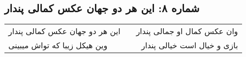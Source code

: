 \begin{center}
\section*{شماره ۸: این هر دو جهان عکس کمالی پندار}
\label{sec:008}
\begin{longtable}{l p{0.5cm} r}
این هر دو جهان عکس کمالی پندار
&&
وان عکس کمال او جمالی پندار
\\
وین هیکل زیبا که تواش میبینی
&&
بازی و خیال است خیالی پندار
\\
\end{longtable}
\end{center}
